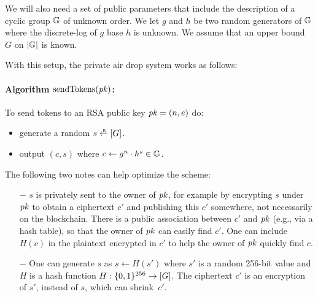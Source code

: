 \documentclass[11pt]{article}
\begin{document}
We will also need a set of public parameters that include the description
of a cyclic group $\mathbb G$ of unknown order.  We let $g$ and $h$ be two
random generators of $\mathbb G$ where the discrete-log of $g$ base $h$ is unknown. 
We assume that an upper bound $G$ on $\lvert \mathbb G \rvert$ is known. 

\noindent
With this setup, the private air drop system works as follows:

\paragraph{Algorithm $\text{sendTokens}(\mathit{pk})$:}
To send tokens to an RSA public key $\mathit{pk} = (n, e)$ do:
\begin{itemize}
\item 
generate a random $s \rgets \range{G}$.

\item 
output $(c, s)$ where $c \gets g^n \cdot h^s \in \mathbb G$.
\end{itemize}

\medskip\noindent 
The following two notes can help optimize the scheme:
\begin{itemize}
\item[$-$] $s$ is privately sent to the owner of $\mathit{pk}$, for example
by encrypting $s$ under $\mathit{pk}$ to obtain a ciphertext $c'$ and
publishing this $c'$ somewhere, not necessarily on the blockchain.  There is
a public association between $c'$ and $\mathit{pk}$ (e.g., via a hash table),
so that the owner of $\mathit{pk}$ can easily find $c'$.  One can include
$H(c)$ in the plaintext encrypted in $c'$ to help the owner of $\mathit{pk}$
quickly find $c$.  

\item[$-$] One can generate $s$ 
as $s \gets H(s')$ where $s'$ is a random 256-bit value and $H$ is a hash
function $H:\{0,1\}^{256} \to [{G}]$.  The ciphertext $c'$ is
an encryption of $s'$, instead of $s$, which can shrink~$c'$.
\end{itemize}
\end{document}
